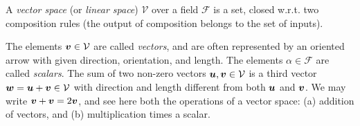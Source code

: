 A \emph{vector space} (or \emph{linear space}) $\mathcal{V}$ over a field $\mathcal{F}$ is a set, closed w.r.t. two composition rules (the output of composition belongs to the set of inputs).

%
%
%

The elements ${\mbox{\boldmath $v$}}\in \mathcal{V}$ are called \emph{vectors}, and are often represented by an oriented arrow with given direction, orientation, and length. The elements $\alpha\in\mathcal{F}$ are called \emph{scalars}. The sum of two non-zero vectors ${\mbox{\boldmath $u$}},{\mbox{\boldmath $v$}}\in\mathcal{V}$ is a third vector ${\mbox{\boldmath $w$}} = {\mbox{\boldmath $u$}}+{\mbox{\boldmath $v$}}\in\mathcal{V}$ with direction and length different from both ${\mbox{\boldmath $u$}}$ and ${\mbox{\boldmath $v$}}$.  We may write ${\mbox{\boldmath $v$}}+{\mbox{\boldmath $v$}} = 2{\mbox{\boldmath $v$}}$, and see here both the operations of a vector space: (a) addition of vectors, and (b) multiplication times a scalar. 

